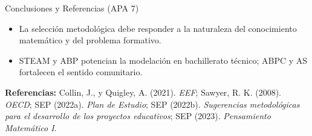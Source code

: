 \documentclass[aspectratio=169,spanish,xcolor=table]{beamer}
\begin{document}
\begin{frame}{Conclusiones y Referencias (APA 7)}
  \begin{itemize}\small
    \item La selección metodológica debe responder a la naturaleza del conocimiento matemático y del problema formativo.
    \item STEAM y ABP potencian la modelación en bachillerato técnico; ABPC y AS fortalecen el sentido comunitario.
  \end{itemize}
  \vspace{0.3cm}
  \scriptsize
  \textbf{Referencias:} Collin, J., y Quigley, A. (2021). \textit{EEF}; Sawyer, R. K. (2008). \textit{OECD}; SEP (2022a). \textit{Plan de Estudio}; SEP (2022b). \textit{Sugerencias metodológicas para el desarrollo de los proyectos educativos}; SEP (2023). \textit{Pensamiento Matemático I}.
\end{frame}
\end{document}
